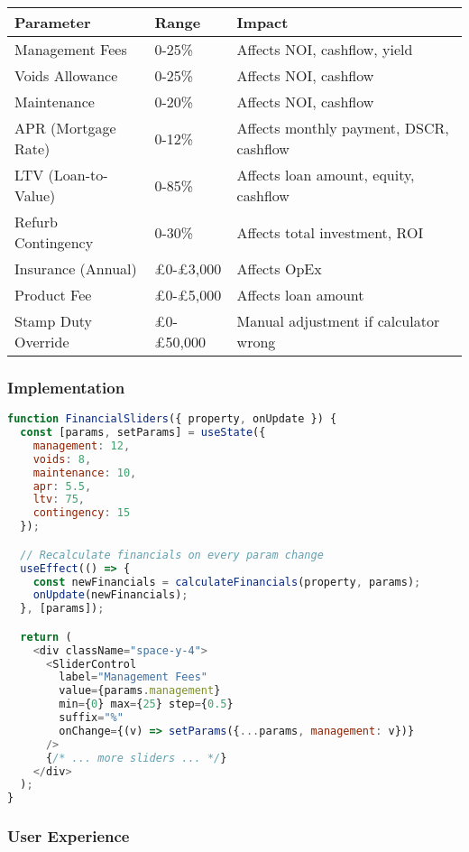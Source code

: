 \documentclass[11pt,a4paper]{article}
\begin{document}
\begin{longtable}{@{}p{5cm}p{3cm}p{6cm}@{}}
\toprule
\textbf{Parameter} & \textbf{Range} & \textbf{Impact} \\
\midrule
Management Fees & 0-25\% & Affects NOI, cashflow, yield \\
Voids Allowance & 0-25\% & Affects NOI, cashflow \\
Maintenance & 0-20\% & Affects NOI, cashflow \\
APR (Mortgage Rate) & 0-12\% & Affects monthly payment, DSCR, cashflow \\
LTV (Loan-to-Value) & 0-85\% & Affects loan amount, equity, cashflow \\
Refurb Contingency & 0-30\% & Affects total investment, ROI \\
Insurance (Annual) & £0-£3,000 & Affects OpEx \\
Product Fee & £0-£5,000 & Affects loan amount \\
Stamp Duty Override & £0-£50,000 & Manual adjustment if calculator wrong \\
\bottomrule
\end{longtable}

\subsubsection{Implementation}

\begin{lstlisting}[language=JavaScript, caption=React Slider Component]
function FinancialSliders({ property, onUpdate }) {
  const [params, setParams] = useState({
    management: 12,
    voids: 8,
    maintenance: 10,
    apr: 5.5,
    ltv: 75,
    contingency: 15
  });

  // Recalculate financials on every param change
  useEffect(() => {
    const newFinancials = calculateFinancials(property, params);
    onUpdate(newFinancials);
  }, [params]);

  return (
    <div className="space-y-4">
      <SliderControl
        label="Management Fees"
        value={params.management}
        min={0} max={25} step={0.5}
        suffix="%"
        onChange={(v) => setParams({...params, management: v})}
      />
      {/* ... more sliders ... */}
    </div>
  );
}
\end{lstlisting}

\subsubsection{User Experience}
\end{document}
